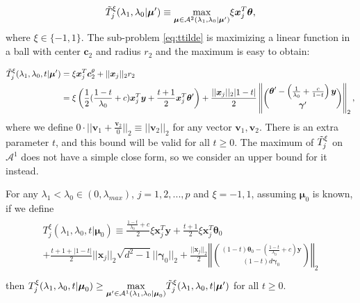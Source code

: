 \begin{equation}
    \label{eq:ttilde}
    \Tilde{T}^\xi_j(\lambda_1,\lambda_0|\boldsymbol\mu')\equiv\underset{\boldsymbol\mu\in\mathcal{A}^2(\lambda_1,\lambda_0|\boldsymbol\mu')}{\mathrm{max}}\xi \boldsymbol x_j^T\boldsymbol\theta,
\end{equation}
where $\xi\in\{-1,1\}$. The sub-problem \eqref{eq:ttilde} is maximizing a linear function in a ball with center $\boldsymbol c_2$ and radius $r_2$ and the maximum is easy to obtain:

\begin{gather}
    \label{eq:ttildexi}
    \begin{aligned}
        \Tilde{T}^\xi_j(\lambda_1,\lambda_0,t|\boldsymbol\mu')&=\xi\boldsymbol x_j^T\boldsymbol c_2^\theta+||\boldsymbol x_j||_2r_2\\
        &=\xi\left( \frac{1}{2}(\frac{1-t}{\lambda_0}+c)\boldsymbol x_j^T\boldsymbol y+\frac{t+1}{2}\boldsymbol x_j^T\boldsymbol\theta'\right)+\frac{||\boldsymbol x_j||_2|1-t|}{2}\left\Vert\binom{\boldsymbol\theta'-\left(\frac{1}{\lambda_0}+\frac{c}{1-t}\right)\boldsymbol y}{\boldsymbol\gamma'}\right\Vert_2,\\
    \end{aligned}
\end{gather}
where we define $0\cdot||\boldsymbol v_1+\frac{\boldsymbol v_2}{0}||_2\equiv ||\boldsymbol v_2||_2$ for any vector $\boldsymbol v_1,\boldsymbol v_2$. There is an extra parameter $t$, and this bound will be valid for all $t\geq 0$. The maximum of $\Tilde{T}^\xi_j$ on $\mathcal{A}^1$ does not have a simple close form, so we consider an upper bound for it instead.

\begin{theorem}
    \label{thm:2.1}
    For any $\lambda_1<\lambda_{0}\in (0,\lambda_{max})$, $j=1,2,...,p$ and $\xi=-1,1$, assuming $\boldsymbol\mu_0$ is known, if we define
    \begin{align}
        \begin{gathered}
            T^\xi_j(\lambda_1,\lambda_0,t|\boldsymbol\mu_0)\equiv\frac{\frac{1-t}{\lambda_0}+c}{2}\xi\boldsymbol x_j^T \boldsymbol y+\frac{t+1}{2}\xi \boldsymbol x_j^T \boldsymbol \theta_{0}\\+\frac{t+1+|1-t|}{2}||\boldsymbol x_j||_2\sqrt{d^2-1}||\boldsymbol\gamma_{0}||_2+\frac{||\boldsymbol x_j||_2}{2}\left\Vert\binom{(1-t)\boldsymbol\theta_{0}-\left(\frac{1-t}{\lambda_0}+c\right)\boldsymbol y}{(1-t)d\boldsymbol\gamma_{0}}\right\Vert_2\\
        \end{gathered}
    \end{align}
    then $T^\xi_j(\lambda_1,\lambda_0,t|\boldsymbol\mu_0)\geq\underset{\boldsymbol\mu'\in\mathcal{A}^1(\lambda_1,\lambda_0|\boldsymbol\mu_0)}{\mathrm{max}}\Tilde{T}^\xi_j(\lambda_1,\lambda_0,t|\boldsymbol\mu')$ for all $t\geq0$.
\end{theorem}

